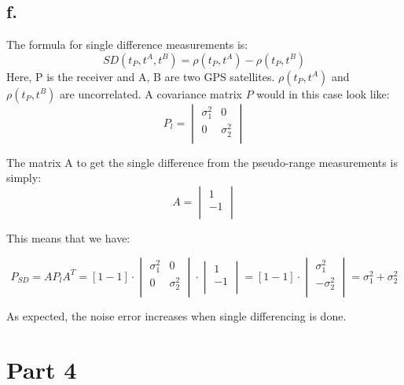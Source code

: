 \documentclass[a4paper,10pt,titlepage]{article}
\begin{document}
\subsection*{f.}
The formula for single difference measurements is: 
\begin{equation}
    SD(t_P, t^A, t^B) = \rho(t_P,t^A) - \rho(t_P,t^B)
\end{equation}
Here, P is the receiver and A, B are two GPS satellites. $\rho(t_P,t^A)$ and $\rho(t_P,t^B)$ are uncorrelated. A covariance matrix $P$ would in this case look like:
\begin{equation*}
    P_l = \begin{vmatrix}
    \sigma_1^2 & 0 \\
    0 & \sigma_2^2 \\
\end{vmatrix}
\end{equation*}

The matrix A to get the single difference from the pseudo-range measurements is simply:
\begin{equation*}
    A = \begin{vmatrix}
    1  \\
    -1 \\
\end{vmatrix}
\end{equation*}

This means that we have:

\begin{equation}
    P_{SD} = A P_l A^T = [1 -1] \cdot \begin{vmatrix}
    \sigma_1^2 & 0 \\
    0 & \sigma_2^2 \\
    \end{vmatrix} \cdot \begin{vmatrix}
    1 \\
    -1 \\
    \end{vmatrix} = [1 -1] \cdot \begin{vmatrix}
    \sigma_1^2 \\
    -\sigma_2^2 \\
    \end{vmatrix} = \sigma_1^2 + \sigma_2^2
\end{equation}

As expected, the noise error increases when single differencing is done.
 

\section{Part 4}
\end{document}

